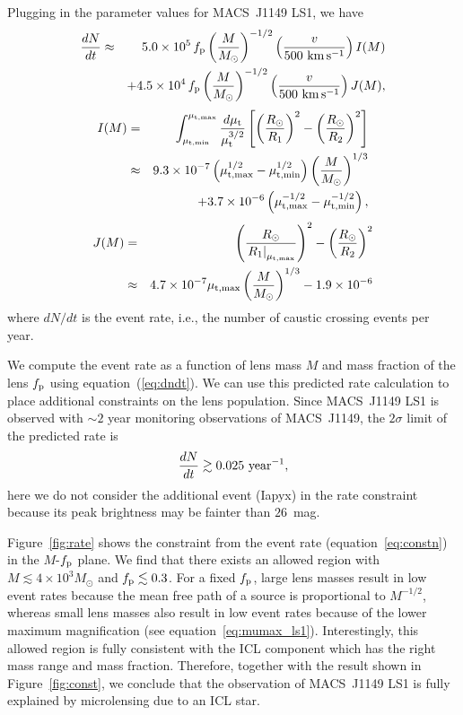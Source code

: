 \documentclass[showpacs,twocolumn,preprintnumbers,amsmath,amssymb,superscriptaddress,nofootinbib]{revtex4}
\begin{document}
Plugging in the parameter values for MACS~J1149 LS1, we have
\begin{eqnarray}
\frac{dN}{dt}&\approx &5.0\times 10^5\,f_{\rm p}\left(\frac{M}{M_\odot}\right)^{-1/2}
\left(\frac{v}{500~{\rm km\,s^{-1}}}\right)I(M)\nonumber\\
&&+4.5\times 10^4\,f_{\rm p}\left(\frac{M}{M_\odot}\right)^{-1/2}
\left(\frac{v}{500~{\rm km\,s^{-1}}}\right)J(M),
\label{eq:dndt}
\end{eqnarray}
\begin{eqnarray}
I(M)&=&\int_{\mu_{\rm t,min}}^{\mu_{\rm t,max}} \frac{d\mu_{\rm t}}{\mu_{\rm
    t}^{3/2}}\left[\left(\frac{R_\odot}{R_1}\right)^2-\left(\frac{R_\odot}{R_2}\right)^2\right]
\nonumber\\
&\approx& 9.3\times 10^{-7}\left(\mu_{\rm t,max}^{1/2}-\mu_{\rm
  t,min}^{1/2}\right)\left(\frac{M}{M_\odot}\right)^{1/3}\nonumber\\
&& +3.7\times 10^{-6}\left(\mu_{\rm t,max}^{-1/2}-\mu_{\rm t,min}^{-1/2}\right),
\end{eqnarray}
\begin{eqnarray}
J(M)&=& \left(\frac{R_\odot}{\left.R_1\right|_{\mu_{\rm t,max}}}\right)^2-\left(\frac{R_\odot}{R_2}\right)^2
\nonumber\\
&\approx& 4.7\times 10^{-7}\mu_{\rm t, max}\left(\frac{M}{M_\odot}\right)^{1/3}-1.9\times 10^{-6}
\end{eqnarray}
where $dN/dt$ is the event rate, i.e., the number of caustic crossing
events per year.

We compute the event rate as a function of lens mass $M$ and mass
fraction of the lens $f_{\rm p}$ using equation~(\ref{eq:dndt}). We
can use this predicted rate calculation to place additional constraints
on the lens population. Since MACS~J1149 LS1 is observed with $\sim 2$
year monitoring observations of MACS~J1149, the $2\sigma$ limit of
the predicted rate is  
\begin{equation}
\frac{dN}{dt}\gtrsim 0.025~{\rm year}^{-1},
\label{eq:constn}
\end{equation}
here we do not consider the additional event (Iapyx) in the rate
constraint because its peak brightness may be fainter than $26$~mag. 

Figure~\ref{fig:rate} shows the constraint from the event rate
(equation~\ref{eq:constn}) in the $M$-$f_{\rm p}$ plane. 
We find that there exists an allowed region with $M\lesssim 
4\times 10^3M_\odot$ and $f_{\rm p}\lesssim 0.3$. 
For a fixed $f_{\rm p}$, large lens masses result in low event rates
because the mean free path of a source is proportional to $M^{-1/2}$,
whereas small lens masses also result in low event rates because of
the lower maximum magnification (see equation~\ref{eq:mumax_ls1}).
Interestingly, this allowed region is fully consistent with the ICL
component which has the right mass range and mass fraction. Therefore,
together with the result shown in Figure~\ref{fig:const}, we conclude
that the observation of MACS~J1149 LS1 is fully explained by
microlensing due to an ICL star.
\end{document}
